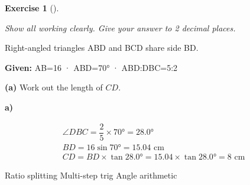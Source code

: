 \documentclass[
  letterpaper,
  DIV=11,
  numbers=noendperiod]{scrreprt}
\theoremstyle{definition}
\newtheorem{exercise}{Exercise}[chapter]
\theoremstyle{remark}
\begin{document}
\begin{exercise}[]\protect\hypertarget{exr-trig-27}{}\label{exr-trig-27}

\emph{Show all working clearly. Give your answer to 2 decimal places.}

Right-angled triangles ABD and BCD share side BD.

\textbf{Given:} AB=16 · \angle ABD=70° ·
\angle ABD:\angle DBC=5:2

\textbf{(a)} Work out the length of \(CD\).

\begin{tcolorbox}[enhanced jigsaw, opacitybacktitle=0.6, coltitle=black, arc=.35mm, colframe=quarto-callout-tip-color-frame, colback=white, bottomrule=.15mm, left=2mm, colbacktitle=quarto-callout-tip-color!10!white, titlerule=0mm, opacityback=0, title=\textcolor{quarto-callout-tip-color}{\faLightbulb}\hspace{0.5em}{🔍 View Solution}, leftrule=.75mm, breakable, rightrule=.15mm, bottomtitle=1mm, toptitle=1mm, toprule=.15mm]

\textbf{a)}

\[
\begin{aligned}
\angle DBC = \dfrac{2}{5} \times 70° = 28.0° \\ BD = 16 \sin 70° = 15.04 \text{ cm} \\ CD = BD \times \tan 28.0° = 15.04 \times \tan 28.0° = 8 \text{ cm}
\end{aligned}
\]

\end{tcolorbox}

{Ratio splitting} {Multi-step trig} {Angle arithmetic}

\end{exercise}
\end{document}
